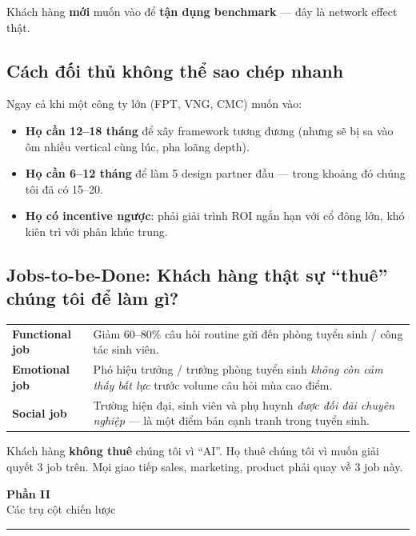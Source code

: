 \documentclass[11pt,a4paper]{article}
\begin{document}
Khách hàng \textbf{mới} muốn vào để \textbf{tận dụng benchmark} --- đây là network effect thật.

\subsection{Cách đối thủ không thể sao chép nhanh}

Ngay cả khi một công ty lớn (FPT, VNG, CMC) muốn vào:
\begin{itemize}
\item \textbf{Họ cần 12--18 tháng} để xây framework tương đương (nhưng sẽ bị sa vào ôm nhiều vertical cùng lúc, pha loãng depth).
\item \textbf{Họ cần 6--12 tháng} để làm 5 design partner đầu --- trong khoảng đó chúng tôi đã có 15--20.
\item \textbf{Họ có incentive ngược}: phải giải trình ROI ngắn hạn với cổ đông lớn, khó kiên trì với phân khúc trung.
\end{itemize}

\subsection{Jobs-to-be-Done: Khách hàng thật sự ``thuê'' chúng tôi để làm gì?}

\begin{tabularx}{\linewidth}{@{}p{4cm} X@{}}
\toprule
\textbf{Functional job} & Giảm 60--80\% câu hỏi routine gửi đến phòng tuyển sinh / công tác sinh viên. \\
\textbf{Emotional job} & Phó hiệu trưởng / trưởng phòng tuyển sinh \textit{không còn cảm thấy bất lực} trước volume câu hỏi mùa cao điểm. \\
\textbf{Social job} & Trường hiện đại, sinh viên và phụ huynh \textit{được đối đãi chuyên nghiệp} --- là một điểm bán cạnh tranh trong tuyển sinh. \\
\bottomrule
\end{tabularx}

Khách hàng \textbf{không thuê} chúng tôi vì ``AI''. Họ thuê chúng tôi vì muốn
giải quyết 3 job trên. Mọi giao tiếp sales, marketing, product phải quay về 3
job này.

\clearpage

\begin{center}
\vspace*{0.5em}
{\sffamily\bfseries\Huge\color{ink} Phần II}\\[0.5em]
{\sffamily\LARGE\color{mid} Các trụ cột chiến lược}\\[0.5em]
{\color{mid}\rule{6cm}{0.4pt}}
\end{center}
\vspace{1em}
\end{document}
